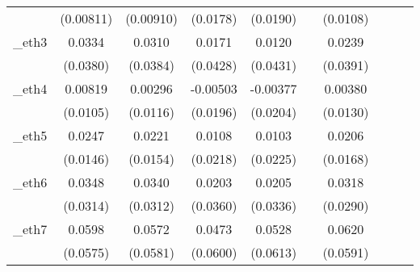 \begin{table}[htbp]
\begin{tabular}{l*{9}{c}}
            &   (0.00811)         &   (0.00910)         &    (0.0178)         &    (0.0190)         &                     &    (0.0108)         &                     &                     &                     \\
[1em]
\_eth3       &      0.0334         &      0.0310         &      0.0171         &      0.0120         &                     &      0.0239         &                     &                     &                     \\
            &    (0.0380)         &    (0.0384)         &    (0.0428)         &    (0.0431)         &                     &    (0.0391)         &                     &                     &                     \\
[1em]
\_eth4       &     0.00819         &     0.00296         &    -0.00503         &    -0.00377         &                     &     0.00380         &                     &                     &                     \\
            &    (0.0105)         &    (0.0116)         &    (0.0196)         &    (0.0204)         &                     &    (0.0130)         &                     &                     &                     \\
[1em]
\_eth5       &      0.0247\sym{*}  &      0.0221         &      0.0108         &      0.0103         &                     &      0.0206         &                     &                     &                     \\
            &    (0.0146)         &    (0.0154)         &    (0.0218)         &    (0.0225)         &                     &    (0.0168)         &                     &                     &                     \\
[1em]
\_eth6       &      0.0348         &      0.0340         &      0.0203         &      0.0205         &                     &      0.0318         &                     &                     &                     \\
            &    (0.0314)         &    (0.0312)         &    (0.0360)         &    (0.0336)         &                     &    (0.0290)         &                     &                     &                     \\
[1em]
\_eth7       &      0.0598         &      0.0572         &      0.0473         &      0.0528         &                     &      0.0620         &                     &                     &                     \\
            &    (0.0575)         &    (0.0581)         &    (0.0600)         &    (0.0613)         &                     &    (0.0591)         &                     &                     &                     \\

\end{tabular}
\end{table}
